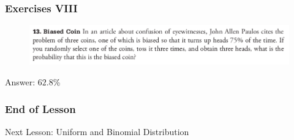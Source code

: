 \documentclass[xcolor=dvipsnames]{beamer}
\begin{document}
\begin{frame}
  \frametitle{Exercises VIII}
\begin{figure}[h]
\includegraphics[scale=.36]{./diagrams/triola_bayes3.png}
\end{figure}
Answer: $62.8$\%
\end{frame}

\begin{frame}
  \frametitle{End of Lesson}
Next Lesson: Uniform and Binomial Distribution
\end{frame}
\end{document}
